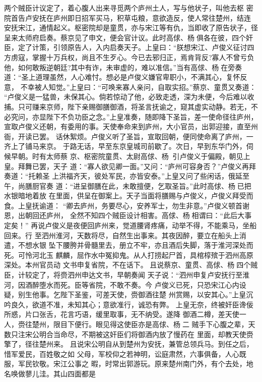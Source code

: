 两个贼臣计议定了，着心腹人出来寻觅两个庐州土人，写与他状子，叫他去枢
密院首告卢安抚在庐州即日招军买马，积草屯粮，意欲造反，使人常往楚州，结连
安抚宋江，通情起义。枢密院却是童贯，亦与宋江等有仇，当即收了原告状子，径
呈来太师府启奏。蔡京见了申文，便会官计议。此时高俅、杨俱各在彼，四个奸
臣，定了计策，引领原告人，入内启奏天子。上皇曰：“朕想宋江、卢俊义征讨四
方虏寇，掌握十万兵权，尚且不生歹心。今已去邪归正，焉肯背反?寡人不曾亏负
他，如何敢叛逆朝廷?其中有诈，未审虚的，难以准信。”当有高俅、杨在旁奏
道：“圣上道理虽然，人心难忖。想必是卢俊义嫌官卑职小，不满其心，复怀反意，
不幸被人知觉。”上皇曰：“可唤来寡人亲问，自取实招。”蔡京、童贯又奏道：
“卢俊义是一猛兽，未保其心。倘若惊动了他，必致走透，深为未便，今后难以收
捕。只可赚来京师，陛下亲赐御膳御酒，将圣言抚谕之，窥其虚实动静。若无，不
必究问，亦显陛下不负功臣之念。”上皇准奏，随即降下圣旨，差一使命径往庐州，
宣取卢俊义还朝，有委用的事。天使奉命来到庐州，大小官员，出郭迎接，直至州
衙，开读已罢。
话休絮烦。卢俊义听了圣旨，宣取回朝，便同使命离了庐州，一齐上了铺马来京。
于路无话，早至东京皇城司前歇了。次日，早到东华门外，伺候早朝。时有太师蔡
京、枢密院童贯、太尉高俅、杨，引卢俊义于偏殿，朝见上皇。拜舞已罢，天子
道：“寡人欲见卿一面。”又问：“庐州可容身否？”卢俊义再拜奏道：“托赖圣
上洪福齐天，彼处军民，亦皆安泰。”上皇又问了些闲话，俄延至午，尚膳厨官奏
道：“进呈御膳在此，未敢擅便，乞取圣旨。”此时高俅、杨已把水银暗地着放
在里面，供呈在御案上。天子当面将膳赐与卢俊义，卢俊义拜受而食。上皇抚谕道：
“卿去庐州，务要尽心，安养军士，勿生非意。”卢俊义顿首谢恩，出朝回还庐州，
全然不知四个贼臣设计相害。高俅、杨相谓曰：“此后大事定矣！”
再说卢俊义是夜便回庐州来，觉道腰肾疼痛，动举不得，不能乘马，坐船回来。行
至泗州淮河，天数将尽，自然生出事来。其夜因醉，要立在船头上消遣，不想水银
坠下腰胯并骨髓里去，册立不牢，亦且酒后失脚，落于淮河深处而死。可怜河北玉
麒麟，屈作水中冤抑鬼。从人打捞起尸首，具棺椁殡于泗州高原深处。本州官员动
文书申复省院，不在话下。
且说蔡京、童贯、高俅、杨四个贼臣，计较定了，将赍泗州申达文书，早朝奏闻
天子说：“泗州申复卢安抚行至淮河，因酒醉堕水而死。臣等省院，不敢不奏。今
卢俊义已死，只恐宋江心内设疑，别生他事。乞陛下圣鉴，可差天使，赍御酒往楚
州赏赐，以安其心。”上皇沉吟良久，欲道不准，未知其心；意欲准行，诚恐有弊。
上皇无奈，终被奸臣谗佞所惑，片口张舌，花言巧语，缓里取事，无不纳受。遂降
御酒二樽，差天使一人，赍往楚州，限目下便行。眼见得这使臣亦是高俅、杨二
贼手下心腹之辈，天数只注宋公明合当命尽，不期被这奸臣们将御酒内放了慢药在
里面，却教天使赍擎了，径往楚州来。
且说宋公明自从到楚州为安抚，兼管总领兵马。到任之后，惜军爱民，百姓敬之如
父母，军校仰之若神明，讼庭肃然，六事俱备，人心既服，军民钦敬。宋江公事之
暇，时常出郭游玩。原来楚州南门外，有个去处，地名唤做蓼儿洼。其山四面都是
